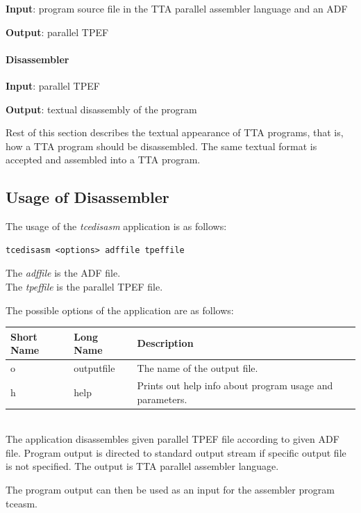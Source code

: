 \documentclass[twoside]{tceusermanual}
\begin{document}
\textbf{Input}: program source file in the TTA parallel assembler language
and an ADF

\textbf{Output}: parallel TPEF

\paragraph{Disassembler}

\textbf{Input}: parallel TPEF

\textbf{Output}: textual disassembly of the program

Rest of this section describes the textual appearance of TTA programs, that
is, how a TTA program should be disassembled.  The same textual format is
accepted and assembled into a TTA program.

\subsection{Usage of Disassembler}

The usage of the \emph{tcedisasm} application is as follows:

\begin{verbatim}
tcedisasm <options> adffile tpeffile
\end{verbatim}

The \emph{adffile} is the ADF file. \\
The \emph{tpeffile} is the parallel TPEF file.

The possible options of the application are as follows:\\

\begin{tabular}{p{}p{}
                p{}}
\textbf{Short Name} &\textbf{Long Name} &\textbf{Description} \\
\hline
o & outputfile  & The name of the output file.\\
h & help        & Prints out help info about program usage and parameters.\\
\end{tabular}\\

The application disassembles given parallel TPEF file according to given ADF
file. Program output is directed to standard output stream if specific output
file is not specified. The output is TTA parallel assembler language.

The program output can then be used as an input for the assembler program
tceasm.
\end{document}
